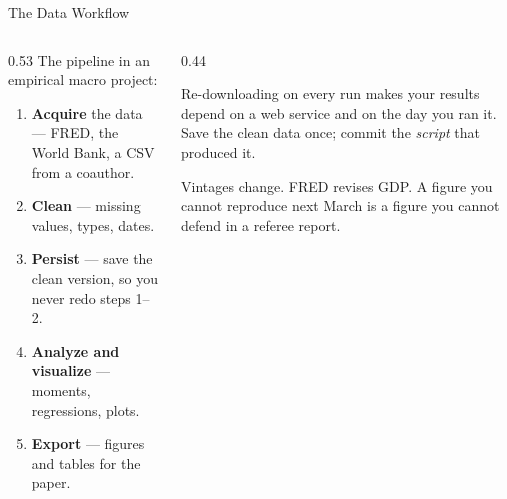 \begin{frame}{The Data Workflow}
\begin{columns}[T]
\begin{column}{0.53\textwidth}
\small
The pipeline in an empirical macro project:
\medskip
\begin{enumerate}\footnotesize
  \item \textbf{Acquire} the data --- FRED, the World Bank, a CSV from a coauthor.
  \item \textbf{Clean} --- missing values, types, dates.
  \item \textbf{Persist} --- save the clean version, so you never redo steps 1--2.
  \item \textbf{Analyze and visualize} --- moments, regressions, plots.
  \item \textbf{Export} --- figures and tables for the paper.
\end{enumerate}
\end{column}
\begin{column}{0.44\textwidth}
\begin{takeawaybox}[title=\textbf{Step 3 is the one people skip}]\small
Re-downloading on every run makes your results depend on a web service and on the day you ran it. Save the clean data once; commit the \emph{script} that produced it.
\end{takeawaybox}
\medskip
\begin{cautionbox}\footnotesize
Vintages change. FRED revises GDP. A figure you cannot reproduce next March is a figure you cannot defend in a referee report.
\end{cautionbox}
\end{column}
\end{columns}
\vspace{1mm}
\end{frame}

